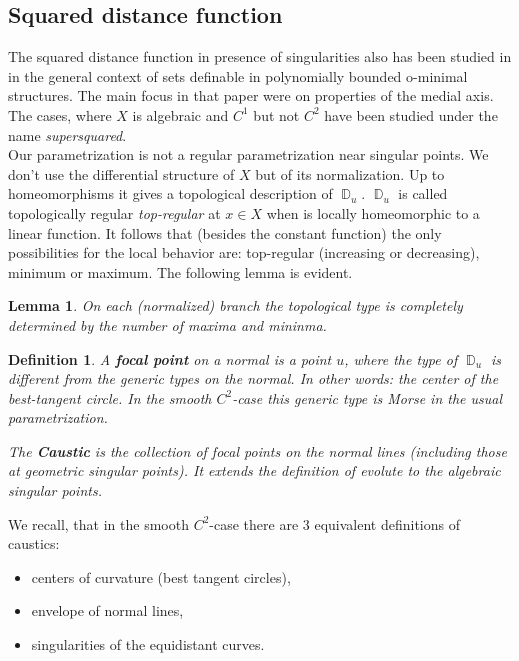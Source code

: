 \documentclass[12pt,a4,twoside]{amsart}
\DeclareMathOperator{\sq}{\mathbb{D}}
\newtheorem{lemma}{Lemma}
\newtheorem*{main lemma}{The main lemma}
\newtheorem{definition}{Definition}
\begin{document}
\subsection{Squared distance function}

The squared distance function in presence of singularities also has been studied in  \cite{De} in the general context of  sets definable in  polynomially bounded o-minimal structures. The main focus in that paper were on properties of the medial  axis. The cases, where $X$ is algebraic and $C^1$ but not $C^2$ have been studied under the name \textit{supersquared}. \\

Our parametrization  is not  a regular parametrization near singular points. We don't use the differential structure of $X$ but of its normalization. Up to homeomorphisms it gives a  topological description of $\sq_u$. 
$\sq_u$ is called topologically regular \textit{top-regular} at $x \in X$ when is locally homeomorphic to a linear function.
It follows that (besides the constant function) the only possibilities for the local behavior are: top-regular (increasing or decreasing), minimum or maximum. The following lemma is evident.


\begin{lemma}
On each (normalized) branch 
the topological type is completely determined by the number of maxima and mininma.  

\end{lemma}




\begin{definition}
A {\bf focal point} on a normal is a point $u$, where the type of $\sq_u$ is different from the generic types on the normal. In other words: the center of the best-tangent circle.   In the smooth $C^2$-case this generic type  is Morse in the usual parametrization.

\noindent
The {\bf Caustic} is the collection of focal points on the normal  lines  (including those at geometric singular points). It extends the definition of evolute to the algebraic singular points.
\end{definition}


We recall, that in the smooth $C^2$-case there are 3 equivalent definitions of caustics:
\begin{itemize}
\item centers of curvature (best tangent circles),
\item envelope of normal lines,
\item singularities of the equidistant curves.
\end{itemize}
\end{document}
